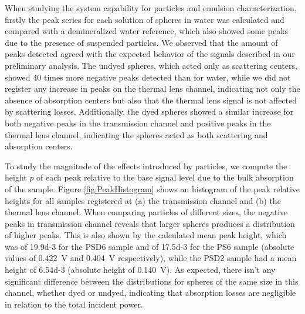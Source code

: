 \documentclass[10pt,authoryear,twocolumn]{article}
\begin{document}
When studying the system capability for particles and emulsion characterization, firstly the peak series for each solution of spheres in water was calculated and compared with a demineralized water reference, which also showed some peaks due to the presence of suspended particles. We observed that the amount of peaks detected agreed with the expected behavior of the signals described in our preliminary analysis. The undyed spheres, which acted only as scattering centers, showed \SI{40}{} times more negative peaks detected than for water, while we did not register any increase in peaks on the thermal lens channel, indicating not only the absence of absorption centers but also that the thermal lens signal is not affected by scattering losses. Additionally, the dyed spheres showed a similar increase for both negative peaks in the transmission channel and positive peaks in the thermal lens channel, indicating the spheres acted as both scattering and absorption centers.

To study the magnitude of the effects introduced by particles, we compute the height $p$ of each peak relative to the base signal level due to the bulk absorption of the sample. Figure \ref{fig:PeakHistogram} shows an histogram of the peak relative heights for all samples registered at (a) the transmission channel and (b) the thermal lens channel. When comparing particles of different sizes, the negative peaks in transmission channel reveals that larger spheres produces a distribution of higher peaks. This is also shown by the calculated mean peak height, which was of \SI{19.9d-3}{} for the PSD6 sample and of \SI{17.5d-3}{} for the PS6 sample (absolute values of \SI{0.422}{\volt} and \SI{0.404}{\volt} respectively), while the PSD2 sample had a mean height of \SI{6.54d-3}{} (absolute height of \SI{0.140}{\volt}). As expected, there isn't any significant difference between the distributions for spheres of the same size in this channel, whether dyed or undyed, indicating that absorption losses are negligible in relation to the total incident power.
\end{document}
